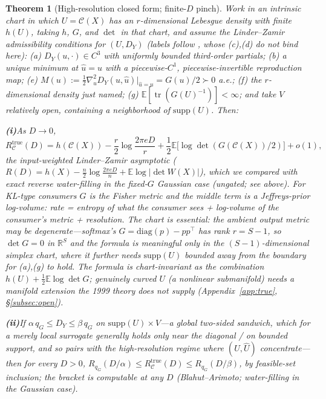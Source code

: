 \documentclass[11pt]{article}
\newtheorem{theorem}{Theorem}
\theoremstyle{definition}
\theoremstyle{remark}
\newcommand{\tr}{\operatorname{tr}}
\newcommand{\E}{\mathbb{E}}
\begin{document}
\begin{theorem}[High-resolution closed form; finite-$D$ pinch]\label{thm:B3}
Work in an intrinsic chart in which $U=\mathcal{C}(X)$ has an $r$-dimensional Lebesgue
density with finite $h(U)$, taking $h$, $G$, and $\det$ in that chart, and assume the
Linder--Zamir admissibility conditions \cite{linderzamir1999} for $(U,D_Y)$ (labels follow \cite{linderzamir1999}, whose (c),(d) do not bind here): \emph{(a)}
$D_Y(u,\cdot)\in C^3$ with uniformly bounded third-order partials; \emph{(b)} a unique
minimum at $\hat u=u$ with a piecewise-$C^1$, piecewise-invertible reproduction map;
\emph{(e)} $M(u):=\tfrac12\nabla^2_{\hat u}D_Y(u,\hat u)|_{\hat u=u}=G(u)/2\succ0$ a.e.;
\emph{(f)} the $r$-dimensional density just named; \emph{(g)}
$\E[\tr(G(U)^{-1})]<\infty$; and take $V$ relatively open, containing a neighborhood of
$\mathrm{supp}(U)$. Then:

\smallskip\noindent\textbf{(i)}\;As $D\to0$,
\[
R_{\mathcal{C}}^{\mathrm{true}}(D)=h(\mathcal{C}(X))-\frac r2\log\frac{2\pi eD}{r}
+\frac12\E\bigl[\log\det(G(\mathcal{C}(X))/2)\bigr]+o(1),
\]
the input-weighted Linder--Zamir asymptotic ($R(D)=h(X)-\tfrac n2\log\tfrac{2\pi
eD}{n}+\E\log|\det W(X)|$), which we compared with exact reverse water-filling in the
fixed-$G$ Gaussian case (ungated; see above). For KL-type consumers $G$ is the Fisher
metric and the middle term is a Jeffreys-prior log-volume: \emph{rate = entropy of
what the consumer sees + log-volume of the consumer's metric + resolution}. The
chart is essential: the ambient output metric may be degenerate---softmax's
$G=\mathrm{diag}(p)-pp^\top$ has rank $r=S-1$, so $\det G=0$ in $\mathbb{R}^S$ and the
formula is meaningful only in the $(S-1)$-dimensional simplex chart, where it further
needs $\mathrm{supp}(U)$ bounded away from the boundary for (a),(g) to hold. The formula
is chart-invariant as the combination $h(U)+\tfrac12\E\log\det G$; genuinely
\emph{curved} $U$ (a nonlinear submanifold) needs a manifold extension the 1999 theory
does not supply (Appendix~\ref{app:true}, \S\ref{subsec:open}).

\smallskip\noindent\textbf{(ii)}\;If $\alpha\,q_G\le D_Y\le\beta\,q_G$ on
$\mathrm{supp}(U)\times V$---a \emph{global} two-sided sandwich, which for a merely
local surrogate generally holds only near the diagonal / on bounded support, and so
pairs with the high-resolution regime where $(U,\hat U)$ concentrate---then for every
$D>0$, $R_{q_G}(D/\alpha)\le R_{\mathcal{C}}^{\mathrm{true}}(D)\le R_{q_G}(D/\beta)$, by
feasible-set inclusion; the bracket is computable at any $D$ (Blahut--Arimoto;
water-filling in the Gaussian case).
\end{theorem}
\end{document}
